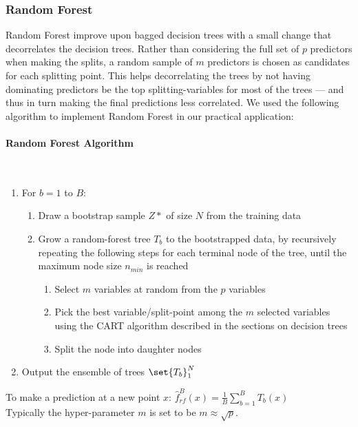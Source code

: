 \documentclass[10pt, a4paper, twocolumn]{article}
\newcommand{\myparagraph}[1]{\paragraph{#1}\mbox{}\\}
\DeclarePairedDelimiter\set\{\}
\begin{document}
			\subsubsection{Random Forest}
				Random Forest improve upon bagged decision trees with a small change that decorrelates the decision trees. Rather than considering the full set of $p$ predictors when making the splits, a random sample of $m$ predictors is chosen as candidates for each splitting point. This helps decorrelating the trees by not having dominating predictors be the top splitting-variables for most of the trees --- and thus in turn making the final predictions less correlated. We used the following algorithm to implement Random Forest in our practical application:
					\myparagraph{Random Forest Algorithm}
					\begin{enumerate}
						\item For $b=1$ to $B$:\begin{enumerate}
							\item Draw a bootstrap sample $Z*$ of size $N$ from the training data
							\item Grow a random-forest tree $T_b$ to the bootstrapped data, by recursively repeating the following steps for each terminal node of the tree, until the maximum node size $n_{min}$ is reached \begin{enumerate}
								\item Select $m$ variables at random from the $p$ variables
								\item Pick the best variable/split-point among the $m$ selected variables using the CART algorithm described in the sections on decision trees
								\item Split the node into daughter nodes
							\end{enumerate}
						\end{enumerate}
						\item Output the ensemble of trees $\set{T_b}^N_1$
					\end{enumerate}
					To make a prediction at a new point $x$:  $\hat{f}_{rf}^B(x)=\frac{1}{B}\sum_{b=1}^B T_b(x)$\\
					Typically the hyper-parameter $m$ is set to be $m\approx\sqrt{p}$.
\end{document}
